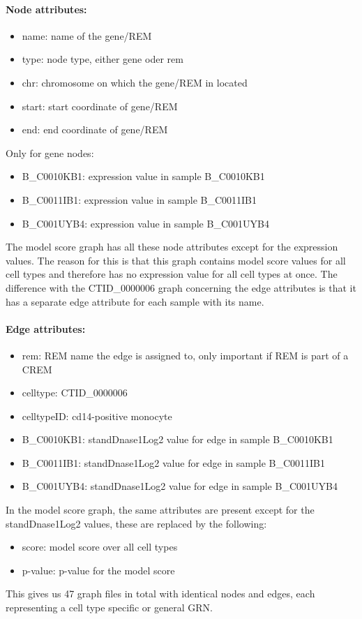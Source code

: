 \documentclass[pdftex,12pt,a4paper]{report}
\begin{document}
\paragraph{Node attributes:} 
\begin{itemize}
\item name: name of the gene/REM
\item type: node type, either gene oder rem
\item chr: chromosome on which the gene/REM in located
\item start: start coordinate of gene/REM
\item end: end coordinate of gene/REM
\end{itemize}
Only for gene nodes:
\begin{itemize}
\item B\_C0010KB1: expression value in sample B\_C0010KB1
\item B\_C0011IB1: expression value in sample B\_C0011IB1
\item B\_C001UYB4: expression value in sample B\_C001UYB4
\end{itemize}
The model score graph has all these node attributes except for the expression values. The reason for this is that this graph contains model score values for all cell types and therefore has no expression value for all cell types at once. 
The difference with the CTID\_0000006 graph concerning the edge attributes is that it has a separate edge attribute for each sample with its name. 
\paragraph{Edge attributes:} 
\begin{itemize}
\item rem: REM name the edge is assigned to, only important if REM is part of a CREM
\item celltype: CTID\_0000006
\item celltypeID: cd14-positive monocyte
\item B\_C0010KB1: standDnase1Log2 value for edge in sample B\_C0010KB1
\item B\_C0011IB1: standDnase1Log2 value for edge in sample B\_C0011IB1
\item B\_C001UYB4: standDnase1Log2 value for edge in sample B\_C001UYB4
\end{itemize}
In the model score graph, the same attributes are present except for the standDnase1Log2 values, these are replaced by the following:
\begin{itemize}
\item score: model score over all cell types
\item p-value: p-value for the model score
\end{itemize}
This gives us 47 graph files in total with identical nodes and edges, each representing a cell type specific or general GRN.
\end{document}
